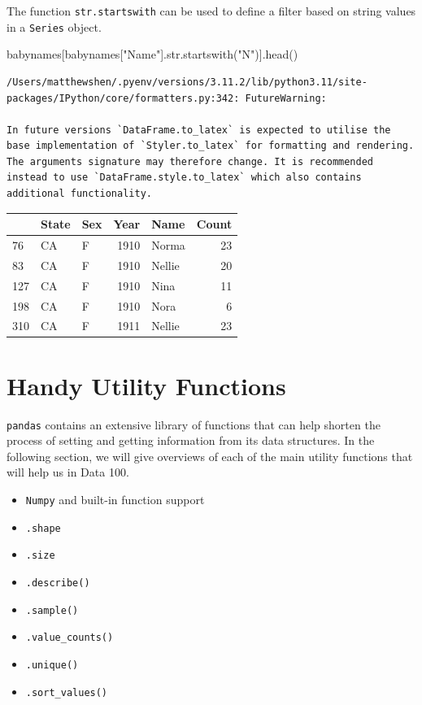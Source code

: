\documentclass[
  letterpaper,
  DIV=11,
  numbers=noendperiod]{scrreprt}
\newenvironment{Shaded}{\begin{snugshade}}{\end{snugshade}}
\newcommand{\BuiltInTok}[1]{\textcolor[rgb]{0.00,0.23,0.31}{#1}}
\newcommand{\NormalTok}[1]{\textcolor[rgb]{0.00,0.23,0.31}{#1}}
\newcommand{\StringTok}[1]{\textcolor[rgb]{0.13,0.47,0.30}{#1}}
\providecommand{\tightlist}{%
  \setlength{\itemsep}{0pt}\setlength{\parskip}{0pt}}\usepackage{longtable,booktabs,array}
\begin{document}
The function \texttt{str.startswith} can be used to define a filter
based on string values in a \texttt{Series} object.

\begin{Shaded}
\begin{Highlighting}[]
\NormalTok{babynames[babynames[}\StringTok{"Name"}\NormalTok{].}\BuiltInTok{str}\NormalTok{.startswith(}\StringTok{"N"}\NormalTok{)].head()}
\end{Highlighting}
\end{Shaded}

\begin{verbatim}
/Users/matthewshen/.pyenv/versions/3.11.2/lib/python3.11/site-packages/IPython/core/formatters.py:342: FutureWarning:

In future versions `DataFrame.to_latex` is expected to utilise the base implementation of `Styler.to_latex` for formatting and rendering. The arguments signature may therefore change. It is recommended instead to use `DataFrame.style.to_latex` which also contains additional functionality.
\end{verbatim}

\begin{tabular}{lllrlr}
\toprule
{} & State & Sex &  Year &    Name &  Count \\
\midrule
76  &    CA &   F &  1910 &   Norma &     23 \\
83  &    CA &   F &  1910 &  Nellie &     20 \\
127 &    CA &   F &  1910 &    Nina &     11 \\
198 &    CA &   F &  1910 &    Nora &      6 \\
310 &    CA &   F &  1911 &  Nellie &     23 \\
\bottomrule
\end{tabular}

\hypertarget{handy-utility-functions}{%
\section{Handy Utility Functions}\label{handy-utility-functions}}

\texttt{pandas} contains an extensive library of functions that can help
shorten the process of setting and getting information from its data
structures. In the following section, we will give overviews of each of
the main utility functions that will help us in Data 100.

\begin{itemize}
\tightlist
\item
  \texttt{Numpy} and built-in function support
\item
  \texttt{.shape}
\item
  \texttt{.size}
\item
  \texttt{.describe()}
\item
  \texttt{.sample()}
\item
  \texttt{.value\_counts()}
\item
  \texttt{.unique()}
\item
  \texttt{.sort\_values()}
\end{itemize}
\end{document}
